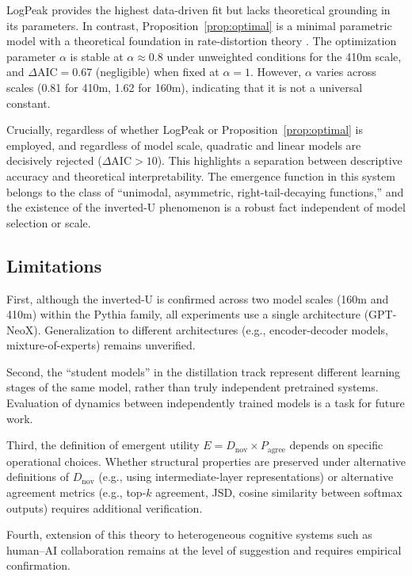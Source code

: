 \documentclass[11pt,a4paper]{article}
\begin{document}
LogPeak provides the highest data-driven fit but lacks theoretical grounding in its parameters.
In contrast, Proposition~\ref{prop:optimal} is a minimal parametric model with a theoretical
foundation in rate-distortion theory \cite{berger1971,shannon1948}. The optimization parameter
$\alpha$ is stable at $\alpha \approx 0.8$ under unweighted conditions for the 410m scale, and
$\Delta\mathrm{AIC} = 0.67$ (negligible) when fixed at $\alpha = 1$. However, $\alpha$ varies
across scales (0.81 for 410m, 1.62 for 160m), indicating that it is not a universal constant.

Crucially, regardless of whether LogPeak or Proposition~\ref{prop:optimal} is employed, and regardless of model
scale, quadratic and linear models are decisively rejected ($\Delta\mathrm{AIC} > 10$). This
highlights a separation between descriptive accuracy and theoretical interpretability. The
emergence function in this system belongs to the class of ``unimodal, asymmetric,
right-tail-decaying functions,'' and the existence of the inverted-U phenomenon is a robust
fact independent of model selection or scale.

\subsection{Limitations}

First, although the inverted-U is confirmed across two model scales (160m and 410m) within the
Pythia family, all experiments use a single architecture (GPT-NeoX). Generalization to
different architectures (e.g., encoder-decoder models, mixture-of-experts) remains unverified.

Second, the ``student models'' in the distillation track represent different learning stages of
the same model, rather than truly independent pretrained systems. Evaluation of dynamics between
independently trained models is a task for future work.

Third, the definition of emergent utility $E = D_\mathrm{nov} \times P_\mathrm{agree}$ depends
on specific operational choices. Whether structural properties are preserved under alternative
definitions of $D_\mathrm{nov}$ (e.g., using intermediate-layer representations) or alternative
agreement metrics (e.g., top-$k$ agreement, JSD, cosine similarity between softmax outputs)
requires additional verification.

Fourth, extension of this theory to heterogeneous cognitive systems such as human--AI
collaboration remains at the level of suggestion and requires empirical confirmation.
\end{document}
